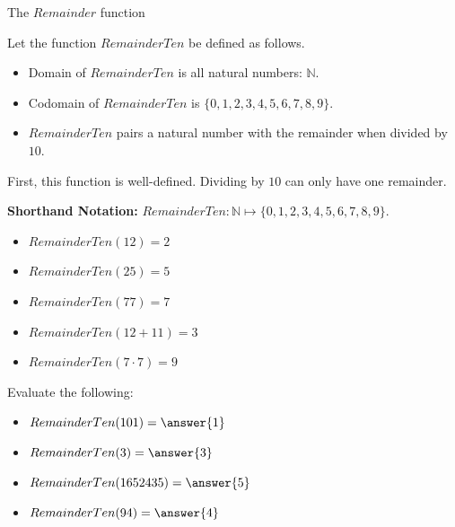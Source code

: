 \documentclass{ximera}
\begin{document}
\begin{example} The $Remainder$ function 

Let the function $RemainderTen$ be defined as follows.


\begin{itemize}
\item Domain of $RemainderTen$ is all natural numbers: $\mathbb{N}$.
\item Codomain of $RemainderTen$ is $\{ 0, 1, 2, 3, 4, 5, 6, 7, 8, 9 \}$.
\item $RemainderTen$ pairs a natural number with the remainder when divided by $10$.
\end{itemize}


First, this function is well-defined. Dividing by $10$ can only have one remainder.


\textbf{Shorthand Notation: } $RemainderTen: \mathbb{N} \mapsto \{ 0, 1, 2, 3, 4, 5, 6, 7, 8, 9 \}$.





\begin{itemize}
	\item $RemainderTen(12) = 2$
	\item $RemainderTen(25) = 5$
	\item $RemainderTen(77) = 7$
	\item $RemainderTen(12 + 11) = 3$
	\item $RemainderTen(7 \cdot 7) = 9$
\end{itemize}









\begin{question} 


Evaluate the following:

\begin{itemize}
	\item $RemainderTen(101) = \answer{1}$
	\item $RemainderTen(3) = \answer{3}$
	\item $RemainderTen(1652435) = \answer{5}$
	\item $RemainderTen(94) = \answer{4}$
\end{itemize}

\end{question}



\end{example}
\end{document}
